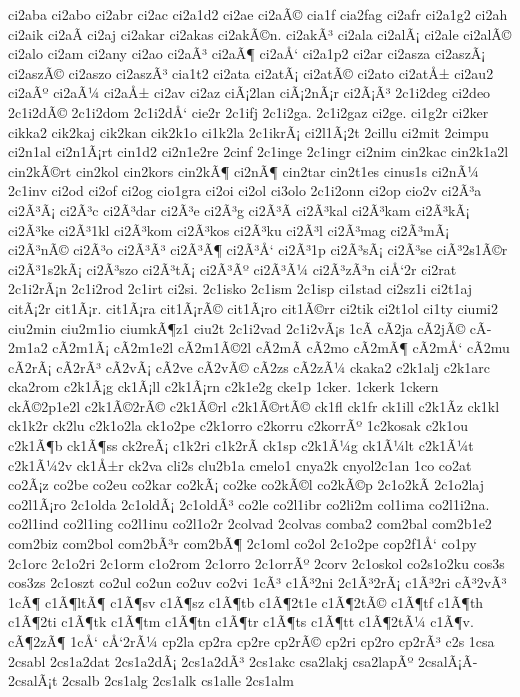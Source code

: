 {ci2aba
ci2abo
ci2abr
ci2ac
ci2a1d2
ci2ae
ci2aÃ©
cia1f
cia2fag
ci2afr
ci2a1g2
ci2ah
ci2aik
ci2aÃ­
ci2aj
ci2akar
ci2akas
ci2akÃ©n.
ci2akÃ³
ci2ala
ci2alÃ¡
ci2ale
ci2alÃ©
ci2alo
ci2am
ci2any
ci2ao
ci2aÃ³
ci2aÃ¶
ci2aÅ‘
ci2a1p2
ci2ar
ci2asza
ci2aszÃ¡
ci2aszÃ©
ci2aszo
ci2aszÃ³
cia1t2
ci2ata
ci2atÃ¡
ci2atÃ©
ci2ato
ci2atÅ±
ci2au2
ci2aÃº
ci2aÃ¼
ci2aÅ±
ci2av
ci2az
ciÃ¡2lan
ciÃ¡2nÃ¡r
ci2Ã¡Ã³
2c1i2deg
ci2deo
2c1i2dÃ©
2c1i2dom
2c1i2dÅ‘
cie2r
2c1ifj
2c1i2ga.
2c1i2gaz
ci2ge.
ci1g2r
ci2ker
cikka2
cik2kaj
cik2kan
cik2k1o
ci1k2la
2c1ikrÃ¡
ci2l1Ã¡2t
2cillu
ci2mit
2cimpu
ci2n1al
ci2n1Ã¡rt
cin1d2
ci2n1e2re
2cinf
2c1inge
2c1ingr
ci2nim
cin2kac
cin2k1a2l
cin2kÃ©rt
cin2kol
cin2kors
cin2kÃ¶
ci2nÃ¶
cin2tar
cin2t1es
cinus1s
ci2nÃ¼
2c1inv
ci2od
ci2of
ci2og
cio1gra
ci2oi
ci2ol
ci3olo
2c1i2onn
ci2op
cio2v
ci2Ã³a
ci2Ã³Ã¡
ci2Ã³c
ci2Ã³dar
ci2Ã³e
ci2Ã³g
ci2Ã³Ã­
ci2Ã³kal
ci2Ã³kam
ci2Ã³kÃ¡
ci2Ã³ke
ci2Ã³1kl
ci2Ã³kom
ci2Ã³kos
ci2Ã³ku
ci2Ã³l
ci2Ã³mag
ci2Ã³mÃ¡
ci2Ã³nÃ©
ci2Ã³o
ci2Ã³Ã³
ci2Ã³Ã¶
ci2Ã³Å‘
ci2Ã³1p
ci2Ã³sÃ¡
ci2Ã³se
ciÃ³2s1Ã©r
ci2Ã³1s2kÃ¡
ci2Ã³szo
ci2Ã³tÃ¡
ci2Ã³Ãº
ci2Ã³Ã¼
ci2Ã³zÃ³n
ciÅ‘2r
ci2rat
2c1i2rÃ¡n
2c1i2rod
2c1irt
ci2si.
2c1isko
2c1ism
2c1isp
ci1stad
ci2sz1i
ci2t1aj
citÃ¡2r
cit1Ã¡r.
cit1Ã¡ra
cit1Ã¡rÃ©
cit1Ã¡ro
cit1Ã©rr
ci2tik
ci2t1ol
ci1ty
ciumi2
ciu2min
ciu2m1io
ciumkÃ¶z1
ciu2t
2c1i2vad
2c1i2vÃ¡s
1cÃ­
cÃ­2ja
cÃ­2jÃ©
cÃ­2m1a2
cÃ­2m1Ã¡
cÃ­2m1e2l
cÃ­2m1Ã©2l
cÃ­2mÃ­
cÃ­2mo
cÃ­2mÃ¶
cÃ­2mÅ‘
cÃ­2mu
cÃ­2rÃ¡
cÃ­2rÃ³
cÃ­2vÃ¡
cÃ­2ve
cÃ­2vÃ©
cÃ­2zs
cÃ­2zÃ¼
ckaka2
c2k1alj
c2k1arc
cka2rom
c2k1Ã¡g
ck1Ã¡ll
c2k1Ã¡rn
c2k1e2g
cke1p
1cker.
1ckerk
1ckern
ckÃ©2p1e2l
c2k1Ã©2rÃ©
c2k1Ã©rl
c2k1Ã©rtÃ©
ck1fl
ck1fr
ck1ill
c2k1Ã­z
ck1kl
ck1k2r
ck2lu
c2k1o2la
ck1o2pe
c2k1orro
c2korru
c2korrÃº
1c2kosak
c2k1ou
c2k1Ã¶b
ck1Ã¶ss
ck2reÃ¡
c1k2ri
c1k2rÃ­
ck1sp
c2k1Ã¼g
ck1Ã¼lt
c2k1Ã¼t
c2k1Ã¼2v
ck1Å±r
ck2va
cli2s
clu2b1a
cmelo1
cnya2k
cnyol2c1an
1co
co2at
co2Ã¡z
co2be
co2eu
co2kar
co2kÃ¡
co2ke
co2kÃ©l
co2kÃ©p
2c1o2kÃ­
2c1o2laj
co2l1Ã¡ro
2c1olda
2c1oldÃ¡
2c1oldÃ³
co2le
co2l1ibr
co2li2m
col1ima
co2l1i2na.
co2l1ind
co2l1ing
co2l1inu
co2l1o2r
2colvad
2colvas
comba2
com2bal
com2b1e2
com2biz
com2bol
com2bÃ³r
com2bÃ¶
2c1oml
co2ol
2c1o2pe
cop2f1Å‘
co1py
2c1orc
2c1o2ri
2c1orm
c1o2rom
2c1orro
2c1orrÃº
2corv
2c1oskol
co2s1o2ku
cos3s
cos3zs
2c1oszt
co2ul
co2un
co2uv
co2vi
1cÃ³
c1Ã³2ni
2c1Ã³2rÃ¡
c1Ã³2ri
cÃ³2vÃ³
1cÃ¶
c1Ã¶ltÃ¶
c1Ã¶sv
c1Ã¶sz
c1Ã¶tb
c1Ã¶2t1e
c1Ã¶2tÃ©
c1Ã¶tf
c1Ã¶th
c1Ã¶2ti
c1Ã¶tk
c1Ã¶tm
c1Ã¶tn
c1Ã¶tr
c1Ã¶ts
c1Ã¶tt
c1Ã¶2tÃ¼
c1Ã¶v.
cÃ¶2zÃ¶
1cÅ‘
cÅ‘2rÃ¼
cp2la
cp2ra
cp2re
cp2rÃ©
cp2ri
cp2ro
cp2rÃ³
c2s
1csa
2csabl
2cs1a2dat
2cs1a2dÃ¡
2cs1a2dÃ³
2cs1akc
csa2lakj
csa2lapÃº
2csalÃ¡Ã­
2csalÃ¡t
2csalb
2cs1alg
2cs1alk
cs1alle
2cs1alm
}
